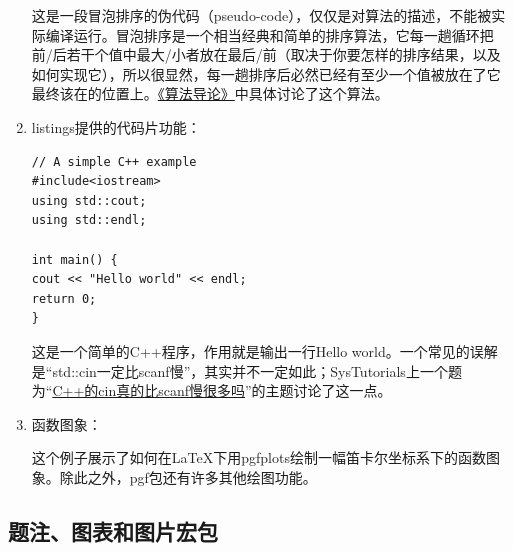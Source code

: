 \begin{enumerate}
这是一段冒泡排序的伪代码（pseudo-code），仅仅是对算法的描述，不能被实际编译运行。冒泡排序是一个相当经典和简单的排序算法，它每一趟循环把前/后若干个值中最大/小者放在最后/前（取决于你要怎样的排序结果，以及如何实现它），所以很显然，每一趟排序后必然已经有至少一个值被放在了它最终该在的位置上。\href{https://labs.xjtudlc.com/labs/wldmt/reading\%20list/books/Algorithms\%20and\%20optimization/Introduction\%20to\%20Algorithms.pdf}{《算法导论》}中具体讨论了这个算法。

\item listings提供的代码片功能：

\begin{lstlisting}[style = GNU_Cpp20_DevCpp]
// A simple C++ example
#include<iostream>
using std::cout;
using std::endl;

int main() {
cout << "Hello world" << endl;
return 0;
}
\end{lstlisting}

这是一个简单的C++程序，作用就是输出一行Hello world。一个常见的误解是“std::cin一定比scanf慢”，其实并不一定如此；SysTutorials上一个题为“\href{https://www.systutorials.com/is-cin-much-slower-than-scanf-in-c/}{C++的cin真的比scanf慢很多吗}”的主题讨论了这一点。

\item 函数图象：

\begin{figure}[H]
	\centering
\end{figure}

这个例子展示了如何在\LaTeX 下用pgfplots绘制一幅笛卡尔坐标系下的函数图象。除此之外，pgf包还有许多其他绘图功能。

\end{enumerate}

\renewcommand{\thefootnote}{\arabic{footnote}}

\subsection{题注、图表和图片宏包}

